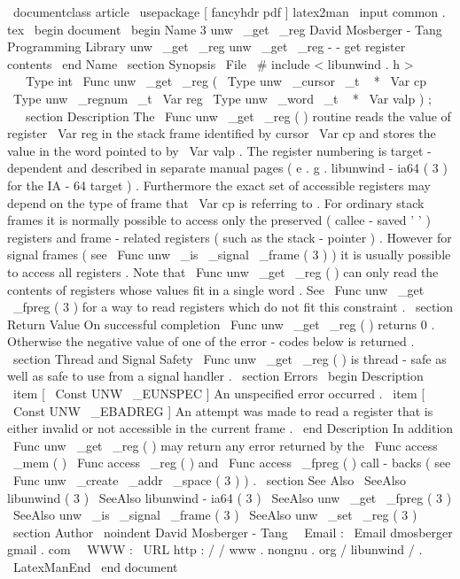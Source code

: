 \
documentclass
{
article
}
\
usepackage
[
fancyhdr
pdf
]
{
latex2man
}
\
input
{
common
.
tex
}
\
begin
{
document
}
\
begin
{
Name
}
{
3
}
{
unw
\
_get
\
_reg
}
{
David
Mosberger
-
Tang
}
{
Programming
Library
}
{
unw
\
_get
\
_reg
}
unw
\
_get
\
_reg
-
-
get
register
contents
\
end
{
Name
}
\
section
{
Synopsis
}
\
File
{
\
#
include
<
libunwind
.
h
>
}
\
\
\
Type
{
int
}
\
Func
{
unw
\
_get
\
_reg
}
(
\
Type
{
unw
\
_cursor
\
_t
~
*
}
\
Var
{
cp
}
\
Type
{
unw
\
_regnum
\
_t
}
\
Var
{
reg
}
\
Type
{
unw
\
_word
\
_t
~
*
}
\
Var
{
valp
}
)
;
\
\
\
section
{
Description
}
The
\
Func
{
unw
\
_get
\
_reg
}
(
)
routine
reads
the
value
of
register
\
Var
{
reg
}
in
the
stack
frame
identified
by
cursor
\
Var
{
cp
}
and
stores
the
value
in
the
word
pointed
to
by
\
Var
{
valp
}
.
The
register
numbering
is
target
-
dependent
and
described
in
separate
manual
pages
(
e
.
g
.
libunwind
-
ia64
(
3
)
for
the
IA
-
64
target
)
.
Furthermore
the
exact
set
of
accessible
registers
may
depend
on
the
type
of
frame
that
\
Var
{
cp
}
is
referring
to
.
For
ordinary
stack
frames
it
is
normally
possible
to
access
only
the
preserved
(
callee
-
saved
'
'
)
registers
and
frame
-
related
registers
(
such
as
the
stack
-
pointer
)
.
However
for
signal
frames
(
see
\
Func
{
unw
\
_is
\
_signal
\
_frame
}
(
3
)
)
it
is
usually
possible
to
access
all
registers
.
Note
that
\
Func
{
unw
\
_get
\
_reg
}
(
)
can
only
read
the
contents
of
registers
whose
values
fit
in
a
single
word
.
See
\
Func
{
unw
\
_get
\
_fpreg
}
(
3
)
for
a
way
to
read
registers
which
do
not
fit
this
constraint
.
\
section
{
Return
Value
}
On
successful
completion
\
Func
{
unw
\
_get
\
_reg
}
(
)
returns
0
.
Otherwise
the
negative
value
of
one
of
the
error
-
codes
below
is
returned
.
\
section
{
Thread
and
Signal
Safety
}
\
Func
{
unw
\
_get
\
_reg
}
(
)
is
thread
-
safe
as
well
as
safe
to
use
from
a
signal
handler
.
\
section
{
Errors
}
\
begin
{
Description
}
\
item
[
\
Const
{
UNW
\
_EUNSPEC
}
]
An
unspecified
error
occurred
.
\
item
[
\
Const
{
UNW
\
_EBADREG
}
]
An
attempt
was
made
to
read
a
register
that
is
either
invalid
or
not
accessible
in
the
current
frame
.
\
end
{
Description
}
In
addition
\
Func
{
unw
\
_get
\
_reg
}
(
)
may
return
any
error
returned
by
the
\
Func
{
access
\
_mem
}
(
)
\
Func
{
access
\
_reg
}
(
)
and
\
Func
{
access
\
_fpreg
}
(
)
call
-
backs
(
see
\
Func
{
unw
\
_create
\
_addr
\
_space
}
(
3
)
)
.
\
section
{
See
Also
}
\
SeeAlso
{
libunwind
(
3
)
}
\
SeeAlso
{
libunwind
-
ia64
(
3
)
}
\
SeeAlso
{
unw
\
_get
\
_fpreg
(
3
)
}
\
SeeAlso
{
unw
\
_is
\
_signal
\
_frame
(
3
)
}
\
SeeAlso
{
unw
\
_set
\
_reg
(
3
)
}
\
section
{
Author
}
\
noindent
David
Mosberger
-
Tang
\
\
Email
:
\
Email
{
dmosberger
gmail
.
com
}
\
\
WWW
:
\
URL
{
http
:
/
/
www
.
nongnu
.
org
/
libunwind
/
}
.
\
LatexManEnd
\
end
{
document
}
